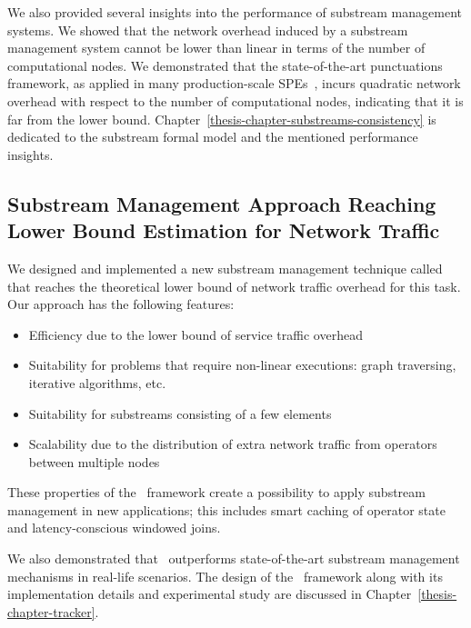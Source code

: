 We also provided several insights into the performance of substream management systems. We showed that the network overhead induced by a substream management system cannot be lower than linear in terms of the number of computational nodes. We demonstrated that the state-of-the-art punctuations framework, as applied in many production-scale SPEs~\cite{tucker2003exploiting}, incurs quadratic network overhead with respect to the number of computational nodes, indicating that it is far from the lower bound. Chapter~\ref{thesis-chapter-substreams-consistency} is dedicated to the substream formal model and the mentioned performance insights.

\subsection{Substream Management Approach Reaching Lower Bound Estimation for Network Traffic}

We designed and implemented a new substream management technique called \tracker~\cite{10.1145/3524860.3539809, trofimov2023bounding} that reaches the theoretical lower bound of network traffic overhead for this task. Our approach has the following features:

\begin{itemize}
    \item Efficiency due to the lower bound of service traffic overhead
    \item Suitability for problems that require non-linear executions: graph traversing, iterative algorithms, etc.
    \item Suitability for substreams consisting of a few elements
    \item Scalability due to the distribution of extra network traffic from operators between multiple nodes
\end{itemize}

These properties of the \tracker\ framework create a possibility to apply substream management in new applications; this includes smart caching of operator state and latency-conscious windowed joins.

We also demonstrated that \tracker\ outperforms state-of-the-art substream management mechanisms in real-life scenarios. The design of the \tracker\ framework along with its implementation details and experimental study are discussed in Chapter~\ref{thesis-chapter-tracker}.